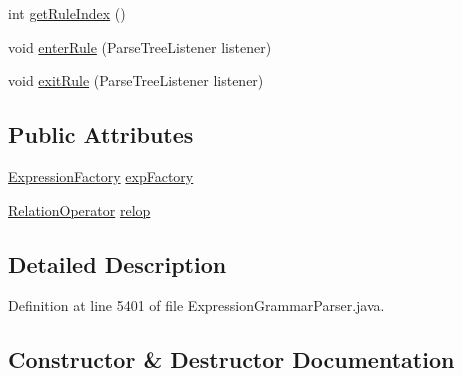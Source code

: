 \begin{DoxyCompactItemize}
\item 
int \hyperlink{classgov_1_1nasa_1_1jpf_1_1inspector_1_1server_1_1expression_1_1parser_1_1_expression_grammar_parser_1_1_rel_op_context_aef0ccd995147b8b3ae190a48187ea0ff}{get\+Rule\+Index} ()
\item 
void \hyperlink{classgov_1_1nasa_1_1jpf_1_1inspector_1_1server_1_1expression_1_1parser_1_1_expression_grammar_parser_1_1_rel_op_context_a8236fb40727eddad5df1da35644f6600}{enter\+Rule} (Parse\+Tree\+Listener listener)
\item 
void \hyperlink{classgov_1_1nasa_1_1jpf_1_1inspector_1_1server_1_1expression_1_1parser_1_1_expression_grammar_parser_1_1_rel_op_context_a448569265f22a148004182e555a8f14a}{exit\+Rule} (Parse\+Tree\+Listener listener)
\end{DoxyCompactItemize}
\subsection*{Public Attributes}
\begin{DoxyCompactItemize}
\item 
\hyperlink{classgov_1_1nasa_1_1jpf_1_1inspector_1_1server_1_1expression_1_1_expression_factory}{Expression\+Factory} \hyperlink{classgov_1_1nasa_1_1jpf_1_1inspector_1_1server_1_1expression_1_1parser_1_1_expression_grammar_parser_1_1_rel_op_context_a1979e878466cd0a896c66876b5138a10}{exp\+Factory}
\item 
\hyperlink{interfacegov_1_1nasa_1_1jpf_1_1inspector_1_1server_1_1programstate_1_1relop_1_1_relation_operator}{Relation\+Operator} \hyperlink{classgov_1_1nasa_1_1jpf_1_1inspector_1_1server_1_1expression_1_1parser_1_1_expression_grammar_parser_1_1_rel_op_context_aa5f29afa92219da0174737b7f24d5581}{relop}
\end{DoxyCompactItemize}


\subsection{Detailed Description}


Definition at line 5401 of file Expression\+Grammar\+Parser.\+java.



\subsection{Constructor \& Destructor Documentation}
